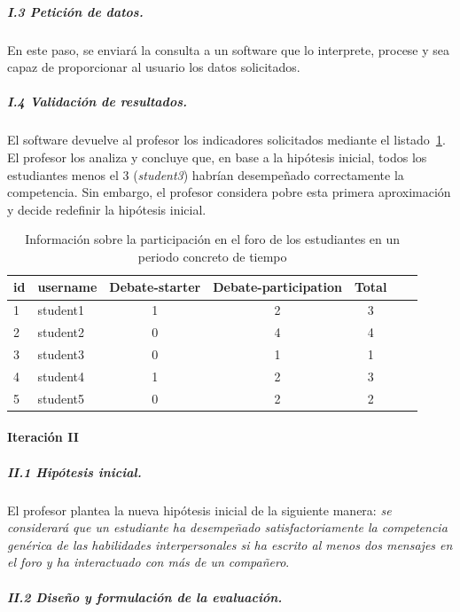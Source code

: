 \subparagraph*{I.3 Petición de datos.}

En este paso, se enviará la consulta a un software que lo interprete, procese y sea capaz de proporcionar al usuario los datos solicitados. %

\subparagraph*{I.4 Validación de resultados.}

El software devuelve al profesor los indicadores solicitados mediante el listado~\ref{tab:EvalCourseEj1}. El profesor los analiza y concluye que, en base a la hipótesis inicial, todos los estudiantes menos el 3 (\emph{student3}) habrían desempeñado correctamente la competencia. Sin embargo, el profesor considera pobre esta primera aproximación y decide redefinir la hipótesis inicial.

\begin{table}
	\centering
	\caption{Información sobre la participación en el foro de los estudiantes en un periodo concreto de tiempo}
	\label{tab:EvalCourseEj1}
	\begin{tabular}{|l|l|c|c|c|c|c|}
		\hline
		id & username & Debate-starter & Debate-participation & Total \\
		\hline
		\hline
		1 & student1 & 1 & 2 & 3  \\
		\hline
		2 & student2 & 0 & 4 & 4  \\
		\hline
		3 & student3 & 0 & 1 & 1  \\
		\hline
		4 & student4 & 1 & 2 & 3  \\
		\hline
		5 & student5 & 0 & 2 & 2  \\
		\hline
	\end{tabular}
\end{table}


\paragraph*{Iteración II}

\subparagraph*{II.1 Hipótesis inicial.}

El profesor plantea la nueva hipótesis inicial de la siguiente manera: \emph{se considerará que un estudiante ha desempeñado satisfactoriamente la competencia genérica de las habilidades interpersonales si ha escrito al menos dos mensajes en el foro y ha interactuado con más de un compañero}.

\subparagraph*{II.2 Diseño y formulación de la evaluación.}

